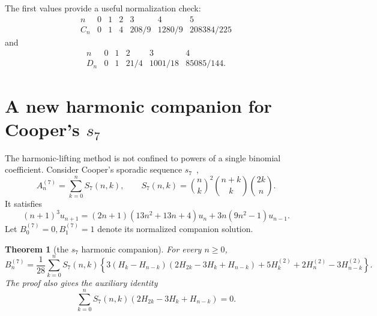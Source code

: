 \documentclass[11pt,reqno]{amsart}
\newtheorem{theorem}{Theorem}[section]
\theoremstyle{definition}
\theoremstyle{remark}
\newcommand{\bin}[2]{\binom{#1}{#2}}
\begin{document}
The first values provide a useful normalization check:
\[
 \begin{array}{c|rrrrrr}
 n&0&1&2&3&4&5\\ \hline
 C_n&0&1&4&208/9&1280/9&208384/225
 \end{array}
\]
and
\[
 \begin{array}{c|rrrrr}
 n&0&1&2&3&4\\ \hline
 D_n&0&1&21/4&1001/18&85085/144.
 \end{array}
\]

\section{A new harmonic companion for Cooper's \texorpdfstring{$s_7$}{s7}}
\label{sec:s7}

The harmonic-lifting method is not confined to powers of a single binomial
coefficient.  Consider Cooper's sporadic sequence
$s_7$~\cite{Gorodetsky,MalikStraub},
\begin{equation}\label{eq:s7shell}
 A_n^{(7)}=\sum_{k=0}^n S_7(n,k),\qquad
 S_7(n,k)=\bin nk^2\bin{n+k}k\bin{2k}n.
\end{equation}
It satisfies
\begin{equation}\label{eq:s7rec}
 (n+1)^3u_{n+1}=(2n+1)(13n^2+13n+4)u_n
                  +3n(9n^2-1)u_{n-1}.
\end{equation}
Let $B_0^{(7)}=0,B_1^{(7)}=1$ denote its normalized companion solution.

\begin{theorem}[the $s_7$ harmonic companion]\label{thm:s7harm}
For every $n\geq0$,
\begin{equation}\label{eq:s7harm}
 \boxed{\displaystyle
 B_n^{(7)}=\frac1{28}\sum_{k=0}^nS_7(n,k)
 \left\{
 3(H_k-H_{n-k})(2H_{2k}-3H_k+H_{n-k})
 +5H_k^{(2)}+2H_n^{(2)}-3H_{n-k}^{(2)}
 \right\}.}
\end{equation}
The proof also gives the auxiliary identity
\begin{equation}\label{eq:s7zero}
 \sum_{k=0}^nS_7(n,k)(2H_{2k}-3H_k+H_{n-k})=0.
\end{equation}
\end{theorem}
\end{document}
